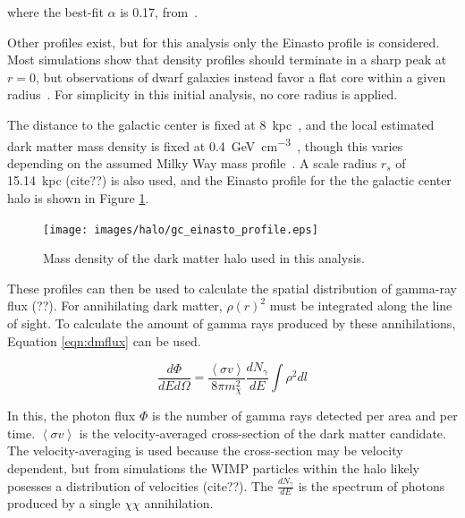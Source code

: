     where the best-fit $\alpha$ is 0.17, from~\cite{PieriGalaxySims}.

    Other profiles exist, but for this analysis only the Einasto profile is considered.
    Most simulations show that density profiles should terminate in a sharp peak at $r=0$, but observations of dwarf galaxies instead favor a flat core within a given radius~\cite{CoreVsCusp}.
    For simplicity in this initial analysis, no core radius is applied.
    
    The distance to the galactic center is fixed at \SI{8}{kpc}~\cite{gc_distance_1,gc_distance_2,gc_distance_3}, and the local estimated dark matter mass density is fixed at \SI{0.4}{\GeV\per\cm^3}~\cite{local_dm_density}, though this varies depending on the assumed Milky Way mass profile~\cite{direct_dm_astrophysical_uncertainties}.
    A scale radius $r_s$ of \SI{15.14}{kpc} {\color{red}(cite??)} is also used, and the Einasto profile for the the galactic center halo is shown in Figure \ref{fig:gchalo_density}.
  
    \begin{figure}[ht]
      \centering
      \texttt{[image: images/halo/gc\_einasto\_profile.eps]}
      \caption[Galactic Center Einasto Halo Density]{
        Mass density of the dark matter halo used in this analysis.}
      \label{fig:gchalo_density}
    \end{figure}
    
    These profiles can then be used to calculate the spatial distribution of gamma-ray {\color{red}flux (??)}.
    For annihilating dark matter, $\rho\left(r\right)^2$ must be integrated along the line of sight.
    To calculate the amount of gamma rays produced by these annihilations, Equation \ref{eqn:dmflux} can be used.
    
    \begin{equation}\label{eqn:dmflux}
      \frac{ d\Phi }{ dE d \Omega } = \frac{ \left \langle \sigma v \right \rangle }{8 \pi m_\chi^2} \frac{dN_{\gamma}}{dE} \int \rho^2 dl
    \end{equation}
    
    In this, the photon flux $\Phi$ is the number of gamma rays detected per area and per time.
    $\left \langle \sigma v \right \rangle$ is the velocity-averaged cross-section of the dark matter candidate.
    The velocity-averaging is used because the cross-section may be velocity dependent, but from simulations the WIMP particles within the halo likely posesses a distribution of velocities {\color{red}(cite??)}.
    The $\frac{dN_{\gamma}}{dE}$ is the spectrum of photons produced by a single $\chi\chi$ annihilation.
    
